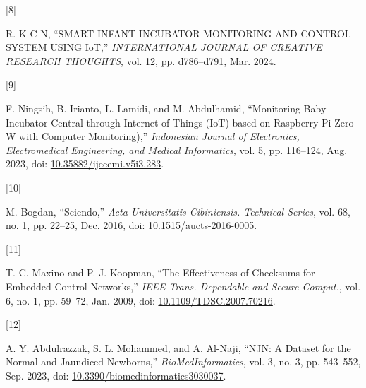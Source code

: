 \documentclass{article}
\newlength{\cslhangindent}
\newlength{\csllabelwidth}
\newenvironment{CSLReferences}[2] %
 {\begin{list}{}{%
  \setlength{\itemindent}{0pt}
  \setlength{\leftmargin}{0pt}
  \setlength{\parsep}{0pt}
  \ifodd #1
   \setlength{\leftmargin}{\cslhangindent}
   \setlength{\itemindent}{-1\cslhangindent}
  \fi
  \setlength{\itemsep}{#2\baselineskip}}}
 {\end{list}}
\newcommand{\CSLLeftMargin}[1]{\parbox[t]{\csllabelwidth}{#1}}
\newcommand{\CSLRightInline}[1]{\parbox[t]{\linewidth - \csllabelwidth}{#1}\break}
\begin{document}
\begin{CSLReferences}{0}{0}
\CSLLeftMargin{{[}8{]} }%
\CSLRightInline{R. K C N, {``{SMART} {INFANT} {INCUBATOR} {MONITORING}
{AND} {CONTROL} {SYSTEM} {USING} {IoT},''} \emph{INTERNATIONAL JOURNAL
OF CREATIVE RESEARCH THOUGHTS}, vol. 12, pp. d786--d791, Mar. 2024.}

\CSLLeftMargin{{[}9{]} }%
\CSLRightInline{F. Ningsih, B. Irianto, L. Lamidi, and M. Abdulhamid,
{``Monitoring {Baby} {Incubator} {Central} through {Internet} of
{Things} ({IoT}) based on {Raspberry} {Pi} {Zero} {W} with {Computer}
{Monitoring}),''} \emph{Indonesian Journal of Electronics,
Electromedical Engineering, and Medical Informatics}, vol. 5, pp.
116--124, Aug. 2023, doi:
\href{https://doi.org/10.35882/ijeeemi.v5i3.283}{10.35882/ijeeemi.v5i3.283}.}

\CSLLeftMargin{{[}10{]} }%
\CSLRightInline{M. Bogdan, {``Sciendo,''} \emph{Acta Universitatis
Cibiniensis. Technical Series}, vol. 68, no. 1, pp. 22--25, Dec. 2016,
doi:
\href{https://doi.org/10.1515/aucts-2016-0005}{10.1515/aucts-2016-0005}.}

\CSLLeftMargin{{[}11{]} }%
\CSLRightInline{T. C. Maxino and P. J. Koopman, {``The {Effectiveness}
of {Checksums} for {Embedded} {Control} {Networks},''} \emph{IEEE Trans.
Dependable and Secure Comput.}, vol. 6, no. 1, pp. 59--72, Jan. 2009,
doi:
\href{https://doi.org/10.1109/TDSC.2007.70216}{10.1109/TDSC.2007.70216}.}

\CSLLeftMargin{{[}12{]} }%
\CSLRightInline{A. Y. Abdulrazzak, S. L. Mohammed, and A. Al-Naji,
{``{NJN}: {A} {Dataset} for the {Normal} and {Jaundiced} {Newborns},''}
\emph{BioMedInformatics}, vol. 3, no. 3, pp. 543--552, Sep. 2023, doi:
\href{https://doi.org/10.3390/biomedinformatics3030037}{10.3390/biomedinformatics3030037}.}

\end{CSLReferences}



\end{document}
